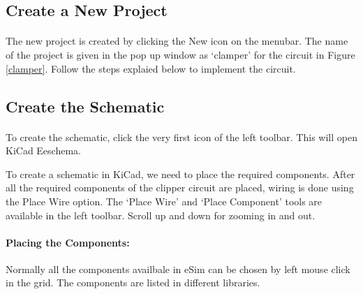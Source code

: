 \subsection*{Create a New Project}

\paragraph{ } The new project is created by clicking the New icon on the
menubar. The name of the project is given in the pop up window as `clamper' for the circuit in Figure \ref{clamper}. Follow the steps explaied below to implement the circuit.
\subsection*{Create the Schematic}

\paragraph{}  To create the schematic, click the very first icon of the
left toolbar. This will open KiCad Eeschema.


To create a schematic in KiCad, we need to place the required components. After all the required components of the clipper circuit are placed, wiring is
done using the Place Wire option. The `Place Wire' and `Place Component' tools are available in the left toolbar. Scroll up and down for zooming in and out.




\paragraph{Placing the Components:} Normally all the components availbale in eSim can be chosen by left mouse click in the grid. The components are listed in different libraries. %

